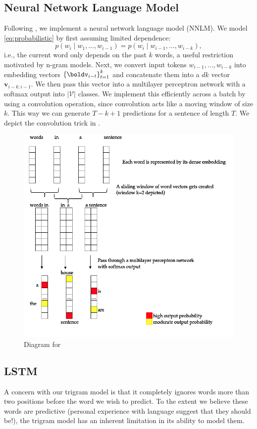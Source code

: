 \documentclass[12pt]{article}
\begin{document}
\subsection{Neural Network Language Model}
\label{sub:nnlm}
Following \cite{bengio2003neural}, we implement a neural network language model
(NNLM). We model \eqref{eq:probabilistic} by first assuming limited dependence: \[
p(w_i \mid w_1,\ldots,w_{i-1}) = p(w_i \mid w_{i-1}, \ldots, w_{i-k}),
\]
i.e., the current word only depends on the past $k$ words, a useful restriction
motivated by n-gram models. Next, we convert input tokens $w_{i-1},\ldots,w_
{i-k}$ into embedding vectors $\br{\boldv_{i-t}}_{t=1}^k$ and concatenate them
into a $dk$ vector $\bm v_{i-k:i-1}$. We then pass this vector into a
multilayer perceptron network with a softmax output into $|\mathcal V|$ classes.
We implement this efficiently across a batch by using a convolution operation,
since convolution acts like a moving window of size $k$. This way we can
generate $T - k + 1$ predictions for a sentence of length $T$. We depict the
convolution trick in . 

\begin{figure}[tb]
    \centering
    \includegraphics[width=.7\textwidth]{figs/nnlang.png}
    \caption{Diagram for }
    \label{fig:nnlm}
\end{figure}

\subsection{LSTM}
\label{subsec:lstm}

A concern with our trigram model is that it completely ignores words more than
two positions before the word we wish to predict. To the extent we believe these
words are predictive (personal experience with language suggest that they should
be!), the trigram model has an inherent limitation in its ability to model them.
\end{document}
